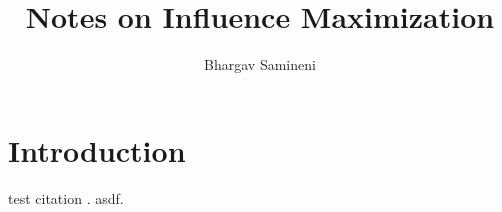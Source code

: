 \documentclass[11pt]{article}
\title{Notes on Influence Maximization}
\author{
    Bhargav Samineni\\
}
\date{}
\begin{document}
    \maketitle  

    \begin{abstract}

    \end{abstract}
    \newpage

    \section{Introduction}
    test citation \cite{kempe2003maximizing, kempe2005influential}. \citet{kempe2003maximizing} asdf. 
    \newpage

    
 
\end{document}
